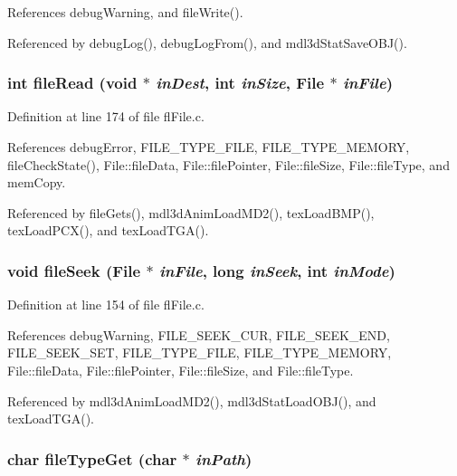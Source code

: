 References debug\-Warning, and file\-Write().

Referenced by debug\-Log(), debug\-Log\-From(), and mdl3d\-Stat\-Save\-OBJ().
\subsubsection{\setlength{\rightskip}{0pt plus 5cm}int file\-Read (void $\ast$ {\em in\-Dest}, int {\em in\-Size}, {\bf File} $\ast$ {\em in\-File})}\label{flFile_8c_bd15952bb98932926572c806c3b3cf20}




Definition at line 174 of file fl\-File.c.

References debug\-Error, FILE\_\-TYPE\_\-FILE, FILE\_\-TYPE\_\-MEMORY, file\-Check\-State(), File::file\-Data, File::file\-Pointer, File::file\-Size, File::file\-Type, and mem\-Copy.

Referenced by file\-Gets(), mdl3d\-Anim\-Load\-MD2(), tex\-Load\-BMP(), tex\-Load\-PCX(), and tex\-Load\-TGA().
\subsubsection{\setlength{\rightskip}{0pt plus 5cm}void file\-Seek ({\bf File} $\ast$ {\em in\-File}, long {\em in\-Seek}, int {\em in\-Mode})}\label{flFile_8c_e5232070b4bd85cfcbeee00f4e8e32a4}




Definition at line 154 of file fl\-File.c.

References debug\-Warning, FILE\_\-SEEK\_\-CUR, FILE\_\-SEEK\_\-END, FILE\_\-SEEK\_\-SET, FILE\_\-TYPE\_\-FILE, FILE\_\-TYPE\_\-MEMORY, File::file\-Data, File::file\-Pointer, File::file\-Size, and File::file\-Type.

Referenced by mdl3d\-Anim\-Load\-MD2(), mdl3d\-Stat\-Load\-OBJ(), and tex\-Load\-TGA().
\subsubsection{\setlength{\rightskip}{0pt plus 5cm}char file\-Type\-Get (char $\ast$ {\em in\-Path})}\label{flFile_8c_702afef29c951ec19b533d9109bbc155}




